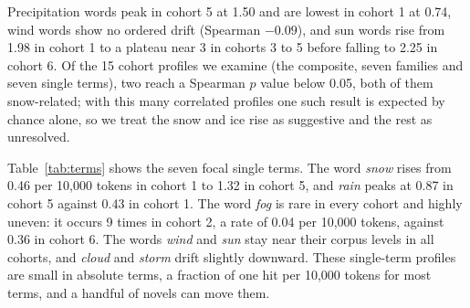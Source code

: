 \documentclass[11pt]{article}
\begin{document}
Precipitation words peak in cohort 5 at 1.50 and are lowest in cohort 1 at 0.74, wind words show no ordered drift (Spearman $-0.09$), and sun words rise from 1.98 in cohort 1 to a plateau near 3 in cohorts 3 to 5 before falling to 2.25 in cohort 6.
Of the 15 cohort profiles we examine (the composite, seven families and seven single terms), two reach a Spearman $p$ value below 0.05, both of them snow-related; with this many correlated profiles one such result is expected by chance alone, so we treat the snow and ice rise as suggestive and the rest as unresolved.



Table~\ref{tab:terms} shows the seven focal single terms. The word \emph{snow} rises from 0.46 per 10,000 tokens in cohort 1 to 1.32 in cohort 5, and \emph{rain} peaks at 0.87 in cohort 5 against 0.43 in cohort 1.
The word \emph{fog} is rare in every cohort and highly uneven: it occurs 9 times in cohort 2, a rate of 0.04 per 10,000 tokens, against 0.36 in cohort 6.
The words \emph{wind} and \emph{sun} stay near their corpus levels in all cohorts, and \emph{cloud} and \emph{storm} drift slightly downward. These single-term profiles are small in absolute terms, a fraction of one hit per 10,000 tokens for most terms, and a handful of novels can move them.
\end{document}
